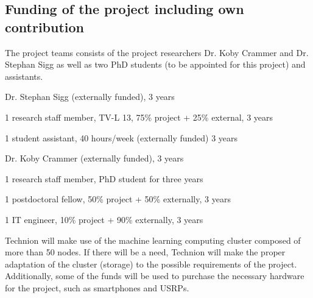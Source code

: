 \documentclass[12pt]{article}
\newcommand{\nolineskips}{
	\setlength{\parskip}{0pt}
	\setlength{\parsep}{0pt}
	\setlength{\topsep}{0pt}
	\setlength{\partopsep}{0pt}
	\setlength{\itemsep}{0pt}}
\begin{document}
\subsection*{Funding of the project including own contribution}
The project teams consists of the project researchers Dr. Koby Crammer and Dr. Stephan Sigg as well as two PhD students (to be appointed for this project) and assistants.
\begin{description}
	\nolineskips
	\item[UGOE] Dr. Stephan Sigg (externally funded), 3 years
	\item[UGOE] 1 research staff member, TV-L 13, 75\% project + 25\% external, 3 years
	\item[UGOE] 1 student assistant, 40 hours/week (externally funded) 3 years
	\item[Technion] Dr. Koby Crammer (externally funded), 3 years 
	\item[Technion] 1 research staff member, PhD student for three years
	\item[Technion] 1 postdoctoral fellow, 50\% project + 50\% externally, 3 years
	\item[Technion] 1 IT engineer, 10\% project + 90\% externally, 3 years
\end{description}
Technion will make use of the machine learning computing cluster composed of more than 50 nodes. If there will be a need, Technion will make the proper adaptation of the cluster (storage) to the possible requirements of the project. Additionally, some of the funds will be used to purchase the necessary hardware for the project, such as smartphones and USRPs.


\pagebreak
\end{document}
